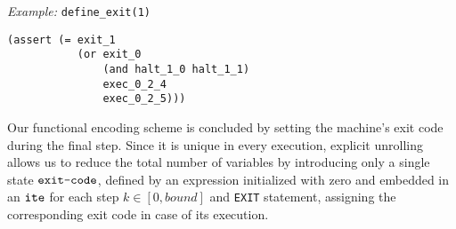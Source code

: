 \noindent
\emph{Example:} \lstinline[style=c++]{define_exit(1)}

\begin{lstlisting}[language=SMTLib]
(assert (= exit_1
           (or exit_0
               (and halt_1_0 halt_1_1)
               exec_0_2_4
               exec_0_2_5)))
\end{lstlisting}



\noindent
Our functional encoding scheme is concluded by setting the machine's exit code during the final step.
Since it is unique in every execution, explicit unrolling allows us to reduce the total number of variables by introducing only a single state $\texttt{exit-code}$, %
defined by an expression initialized with zero and embedded in an $\texttt{ite}$
for each step $k \in [0, bound]$ and \lstinline[language={[concubine]Assembler}]{EXIT} statement, assigning the corresponding exit code in case of its execution.

